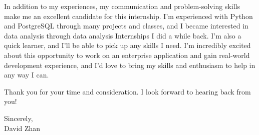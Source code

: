 \documentclass[letterpaper,12pt]{extarticle}
\begin{document}
In addition to my experiences, my communication and problem-solving skills make me an excellent candidate for this internship. I’m experienced with Python and PostgreSQL through many projects and classes, and I became interested in data analysis through data analysis Internships I did a while back. I'm also a quick learner, and I'll be able to pick up any skills I need. I'm incredibly excited about this opportunity to work on an enterprise application and gain real-world development experience, and I'd love to bring my skills and enthusiasm to help in any way I can.



Thank you for your time and consideration. I look forward to hearing back from you!


Sincerely,\\
David Zhan



\end{document}
